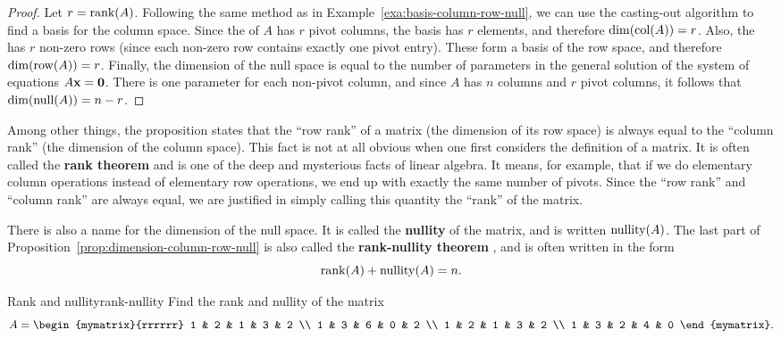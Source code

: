 \begin{proof}
  Let $r=\rank(A)$.  Following the same method as in
  Example~\ref{exa:basis-column-row-null}, we can use the casting-out
  algorithm to find a basis for the column space. Since the {\rref} of
  $A$ has $r$ pivot columns, the basis has $r$ elements, and therefore
  $\dim(\col(A))=r$. Also, the {\rref} has $r$ non-zero rows (since
  each non-zero row contains exactly one pivot entry). These form a
  basis of the row space, and therefore $\dim(\row(A))=r$. Finally,
  the dimension of the null space is equal to the number of parameters
  in the general solution of the system of equations
  $A\mbox{\bf x}=\mbox{\bf 0}$. There is one parameter for each non-pivot
  column, and since $A$ has $n$ columns and $r$ pivot columns, it
  follows that $\dim(\nullspace(A)) = n-r$.
\end{proof}

Among other things, the proposition states that the ``row rank'' of a
matrix (the dimension of its row space) is always equal to the
``column rank'' (the dimension of the column space). This fact is not
at all obvious when one first considers the definition of a matrix. It
is often called the \textbf{rank theorem}%
%
 and is one of the deep and mysterious
facts of linear algebra. It means, for example, that if we do
elementary column operations instead of elementary row operations, we
end up with exactly the same number of pivots. Since the ``row rank''
and ``column rank'' are always equal, we are justified in simply
calling this quantity the ``rank'' of the matrix.

There is also a name for the dimension of the null space. It is called
the \textbf{nullity}%
%
 of the matrix, and is written $\nullity(A)$.
The last part of Proposition~\ref{prop:dimension-column-row-null} is
also called the \textbf{rank-nullity theorem}%
%
, and is often written in the form
\begin{equation*}
  \rank(A) + \nullity(A) = n.
\end{equation*}

\begin{example}{Rank and nullity}{rank-nullity}
  Find the rank and nullity of the matrix
  \begin{equation*}
    A = \begin{mymatrix}{rrrrrr}
      1 & 2 & 1 & 3 & 2 \\
      1 & 3 & 6 & 0 & 2 \\
      1 & 2 & 1 & 3 & 2 \\
      1 & 3 & 2 & 4 & 0
    \end{mymatrix}.
  \end{equation*}
\end{example}

